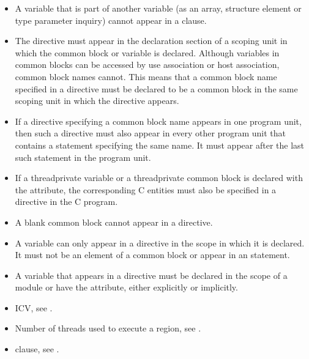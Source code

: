 \begin{fortranspecific}
\begin{itemize} %
\item A variable that is part of another variable (as an array, structure element or type parameter inquiry) cannot
appear in a  clause.

\item The  directive must appear in the declaration section of a scoping
unit in which the common block or variable is declared. Although variables in
common blocks can be accessed by use association or host association, common
block names cannot. This means that a common block name specified in a
 directive must be declared to be a common block in the same
scoping unit in which the  directive appears.

\item If a  directive specifying a common block name appears in one
program unit, then such a directive must also appear in every other program unit that
contains a  statement specifying the same name. It must appear after the last
such  statement in the program unit.

\item If a threadprivate variable or a threadprivate common block is declared
with the  attribute, the corresponding C entities must also be specified in a
 directive in the C program.

\item A blank common block cannot appear in a  directive.

\item A variable can only appear in a  directive in the scope in which it
is declared. It must not be an element of a common block or appear in an
 statement.

\item A variable that appears in a  directive must be declared in the
scope of a module or have the  attribute, either explicitly or implicitly.
\end{itemize} %
\end{fortranspecific}
%
\crossreferences
\begin{itemize}
\item {} ICV, see
.

\item Number of threads used to execute a  region, see
.

\item {} clause, see
.
\end{itemize}








